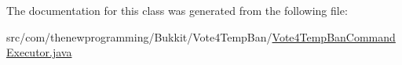 The documentation for this class was generated from the following file\-:\begin{DoxyCompactItemize}
\item 
src/com/thenewprogramming/\-Bukkit/\-Vote4\-Temp\-Ban/\hyperlink{_vote4_temp_ban_command_executor_8java}{Vote4\-Temp\-Ban\-Command\-Executor.\-java}\end{DoxyCompactItemize}
